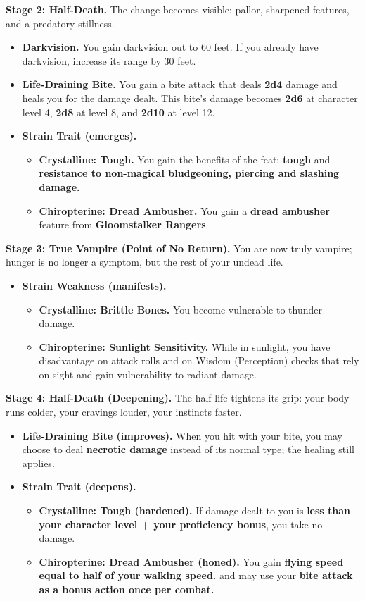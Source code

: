 \documentclass[letterpaper,twocolumn,openany,nodeprecatedcode,breakable,skins,xparse,most]{dndbook}
\begin{document}
\textbf{Stage 2: Half-Death.}
The change becomes visible: pallor, sharpened features, and a predatory stillness.
\begin{itemize}
\item \textbf{Darkvision.} You gain darkvision out to 60 feet. If you already have darkvision, increase its range by 30 feet.
\item \textbf{Life-Draining Bite.} You gain a bite attack that deals \textbf{2d4} damage and heals you for the damage dealt. This bite's damage becomes \textbf{2d6} at character level 4, \textbf{2d8} at level 8, and \textbf{2d10} at level 12.
\item \textbf{Strain Trait (emerges).}
\begin{itemize}
\item \textbf{Crystalline: Tough.} You gain the benefits of the feat: \textbf{tough} and \textbf{resistance to non-magical bludgeoning, piercing and slashing damage.}
\item \textbf{Chiropterine: Dread Ambusher.} You gain a \textbf{dread ambusher} feature from \textbf{Gloomstalker Rangers}.
\end{itemize}
\end{itemize}

\textbf{Stage 3: True Vampire (Point of No Return).}
You are now truly vampire; hunger is no longer a symptom, but the rest of your undead life.
\begin{itemize}
\item \textbf{Strain Weakness (manifests).}
\begin{itemize}
\item \textbf{Crystalline: Brittle Bones.} You become vulnerable to thunder damage.
\item \textbf{Chiropterine: Sunlight Sensitivity.} While in sunlight, you have disadvantage on attack rolls and on Wisdom (Perception) checks that rely on sight and gain vulnerability to radiant damage.
\end{itemize}
\end{itemize}

\textbf{Stage 4: Half-Death (Deepening).}
The half-life tightens its grip: your body runs colder, your cravings louder, your instincts faster.
\begin{itemize}
\item \textbf{Life-Draining Bite (improves).} When you hit with your bite, you may choose to deal \textbf{necrotic damage} instead of its normal type; the healing still applies.
\item \textbf{Strain Trait (deepens).}
\begin{itemize}
\item \textbf{Crystalline: Tough (hardened).} If damage dealt to you is \textbf{less than your character level + your proficiency bonus}, you take no damage.
\item \textbf{Chiropterine: Dread Ambusher (honed).} You gain \textbf{flying speed equal to half of your walking speed.} and may use your \textbf{bite attack as a bonus action once per combat.}
\end{itemize}
\end{itemize}
\end{document}
